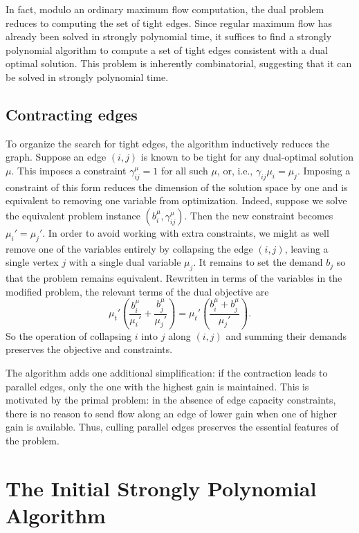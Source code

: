 \documentclass[11pt]{article}
\theoremstyle{definition}
\theoremstyle{definition}
\newcommand{\biu}{b_{i}^{\mu}}
\newcommand{\gij}{\gamma_{ij}}
\newcommand{\giij}{\gamma_{ij}^{\mu}}
\begin{document}
    In fact, modulo an ordinary maximum flow computation, the dual problem reduces to computing
    the set of tight edges. Since regular maximum
    flow has already been solved in strongly polynomial time, it suffices to find a strongly polynomial
    algorithm to compute a set of tight edges consistent with a dual optimal solution. This problem
    is inherently combinatorial, suggesting that it can be solved in strongly polynomial time.
    
    \subsection{Contracting edges}\label{sec:contract}
    To organize the search for tight edges, the algorithm inductively reduces the graph.
    Suppose an edge $(i, j)$ is known to be tight for any dual-optimal solution $\mu$. This
    imposes a constraint $\giij = 1$ for all such $\mu$, or, i.e., $\gij \mu_i = \mu_j$.
    Imposing a constraint of this form reduces the dimension of the solution
    space by one and is equivalent to removing one variable from optimization. Indeed,
    suppose we solve the equivalent problem instance $(\biu, \giij)$. Then the new constraint
    becomes $\mu_i' = \mu_j'$. In order to avoid working with extra constraints, we might
    as well remove one of the variables entirely by collapsing the edge $(i, j)$, leaving a single
    vertex $j$ with a single dual variable $\mu_j$. It remains to set the demand $b_j$ so
    that the problem remains equivalent. Rewritten in terms of the variables in
    the modified problem, the relevant terms of the dual objective are
    \[ \mu_t' \left(\frac{b_i^\mu}{\mu_i'} + \frac{b_j^\mu}{\mu_j'}\right)
     = \mu_t' \left(\frac{b_i^\mu + b_j^\mu}{\mu_j'}\right). \]
	So the operation of collapsing $i$ into $j$ along $(i, j)$ and summing their demands
	preserves the objective and constraints.
	
	The algorithm adds one additional simplification: if the contraction leads to parallel edges,
	only the one with the highest gain is maintained. This is motivated by the primal problem: in
	the absence of edge capacity constraints, there is no reason to send flow along an edge of
	lower gain when one of higher gain is available. Thus, culling parallel edges preserves the
	essential features of the problem.
	

\section{The Initial Strongly Polynomial Algorithm}
\label{sec:2013}
\end{document}
